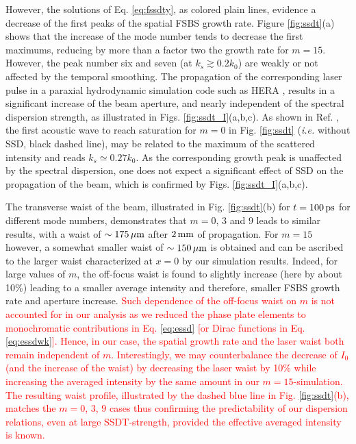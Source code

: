 \documentclass[
 reprint,
 amsmath,amssymb,
 aps,
]{revtex4-1}
\def\tc{\textcolor{red}}
\begin{document}
However, the solutions of Eq. \eqref{eq:fssdty}, as colored plain lines, evidence a decrease of the first peaks of the  spatial FSBS growth rate. Figure \ref{fig:ssdt}(a) shows that the increase of the mode number tends to decrease the first maximums, reducing by more than a factor two the growth rate  for $m= 15$.
However, the peak number six and seven (at $k_s\gtrsim0.2k_0$) are   weakly or not affected by the temporal smoothing. 
The propagation of the corresponding laser pulse in a paraxial hydrodynamic simulation code such as HERA \cite[]{Loiseau_2006},
results in a significant increase of the beam aperture, and  nearly independent of the spectral dispersion strength, as illustrated in Figs. \ref{fig:ssdt_I}(a,b,c).
As shown in Ref. \cite[]{Ruyer_FSBS}, the first acoustic wave to reach saturation for $m=0$ in  Fig. \ref{fig:ssdt} (\emph{i.e.} without SSD, black dashed line), may be related to the maximum of the scattered intensity and reads $k_s\simeq 0.27 k_0$. As the corresponding growth peak is unaffected by the spectral dispersion, one does not expect a significant effect of SSD on the propagation of the beam, which is  confirmed by Figs. \ref{fig:ssdt_I}(a,b,c). 

The transverse waist of the beam, illustrated in Fig. \ref{fig:ssdt}(b) for $t=100\, \rm ps$ for different mode numbers, demonstrates that $m=0$, $3$ and $9$ leads to similar results, with a waist of $\sim 175\,\rm\mu m$ after $2\,\rm mm$ of propagation. For $m=15$ however, a somewhat smaller waist of $\sim 150\,\rm\mu m$ is obtained and can be ascribed to the larger waist characterized at $x=0$ by our simulation results. 
Indeed, for large values of  $m$, the off-focus waist is found to slightly increase (here by about 10\%) leading to a smaller average intensity and therefore, smaller FSBS growth rate and aperture increase. 
\tc{
Such dependence  of the off-focus waist on $m$ is not accounted  for in our analysis as we reduced the phase plate elements to monochromatic contributions in Eq. \eqref{eq:essd} [or Dirac functions in Eq. \eqref{eq:essdwk}]. Hence, in our case, the spatial growth rate and the laser waist both remain independent of $m$. 
Interestingly, we may counterbalance the decrease of $I_0$ (and the increase of the waist) by    decreasing the  laser waist by 10\% while  increasing the averaged intensity  by the same amount in our $m=15$-simulation. The resulting waist profile,  illustrated by the dashed blue line in Fig. \ref{fig:ssdt}(b), matches the $m=0$, $3$, $9$ cases thus confirming the predictability of our dispersion relations, even at large SSDT-strength, provided the effective averaged intensity is known.
}
\end{document}
